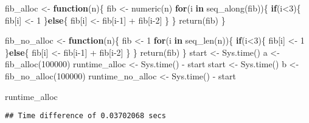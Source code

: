 \documentclass[
]{book}
\newenvironment{Shaded}{\begin{snugshade}}{\end{snugshade}}
\newcommand{\ControlFlowTok}[1]{\textcolor[rgb]{0.13,0.29,0.53}{\textbf{#1}}}
\newcommand{\DecValTok}[1]{\textcolor[rgb]{0.00,0.00,0.81}{#1}}
\newcommand{\FunctionTok}[1]{\textcolor[rgb]{0.00,0.00,0.00}{#1}}
\newcommand{\NormalTok}[1]{#1}
\newcommand{\OtherTok}[1]{\textcolor[rgb]{0.56,0.35,0.01}{#1}}
\newcommand{\SpecialCharTok}[1]{\textcolor[rgb]{0.00,0.00,0.00}{#1}}
\begin{document}
\begin{Shaded}
\begin{Highlighting}[]
\NormalTok{fib\_alloc }\OtherTok{\textless{}{-}} \ControlFlowTok{function}\NormalTok{(n)\{}
\NormalTok{  fib }\OtherTok{\textless{}{-}} \FunctionTok{numeric}\NormalTok{(n)}
  \ControlFlowTok{for}\NormalTok{(i }\ControlFlowTok{in} \FunctionTok{seq\_along}\NormalTok{(fib))\{}
    \ControlFlowTok{if}\NormalTok{(i}\SpecialCharTok{\textless{}}\DecValTok{3}\NormalTok{)\{ }
\NormalTok{      fib[i] }\OtherTok{\textless{}{-}} \DecValTok{1}
\NormalTok{    \}}\ControlFlowTok{else}\NormalTok{\{}
\NormalTok{      fib[i] }\OtherTok{\textless{}{-}}\NormalTok{ fib[i}\DecValTok{{-}1}\NormalTok{] }\SpecialCharTok{+}\NormalTok{ fib[i}\DecValTok{{-}2}\NormalTok{] }
\NormalTok{    \}}
\NormalTok{  \}}
  \FunctionTok{return}\NormalTok{(fib)}
\NormalTok{\}}


\NormalTok{fib\_no\_alloc }\OtherTok{\textless{}{-}} \ControlFlowTok{function}\NormalTok{(n)\{}
\NormalTok{  fib }\OtherTok{\textless{}{-}} \DecValTok{1}
  \ControlFlowTok{for}\NormalTok{(i }\ControlFlowTok{in} \FunctionTok{seq\_len}\NormalTok{(n))\{}
    \ControlFlowTok{if}\NormalTok{(i}\SpecialCharTok{\textless{}}\DecValTok{3}\NormalTok{)\{ }
\NormalTok{      fib[i] }\OtherTok{\textless{}{-}} \DecValTok{1}
\NormalTok{    \}}\ControlFlowTok{else}\NormalTok{\{}
\NormalTok{      fib[i] }\OtherTok{\textless{}{-}}\NormalTok{ fib[i}\DecValTok{{-}1}\NormalTok{] }\SpecialCharTok{+}\NormalTok{ fib[i}\DecValTok{{-}2}\NormalTok{] }
\NormalTok{    \}}
\NormalTok{  \}}
  \FunctionTok{return}\NormalTok{(fib)}
\NormalTok{\}}
\NormalTok{start }\OtherTok{\textless{}{-}} \FunctionTok{Sys.time}\NormalTok{()}
\NormalTok{a }\OtherTok{\textless{}{-}} \FunctionTok{fib\_alloc}\NormalTok{(}\DecValTok{100000}\NormalTok{)}
\NormalTok{runtime\_alloc }\OtherTok{\textless{}{-}} \FunctionTok{Sys.time}\NormalTok{() }\SpecialCharTok{{-}}\NormalTok{ start}
\NormalTok{start }\OtherTok{\textless{}{-}} \FunctionTok{Sys.time}\NormalTok{()}
\NormalTok{b }\OtherTok{\textless{}{-}} \FunctionTok{fib\_no\_alloc}\NormalTok{(}\DecValTok{100000}\NormalTok{)}
\NormalTok{runtime\_no\_alloc }\OtherTok{\textless{}{-}} \FunctionTok{Sys.time}\NormalTok{() }\SpecialCharTok{{-}}\NormalTok{ start}

\NormalTok{runtime\_alloc}
\end{Highlighting}
\end{Shaded}

\begin{verbatim}
## Time difference of 0.03702068 secs
\end{verbatim}
\end{document}
